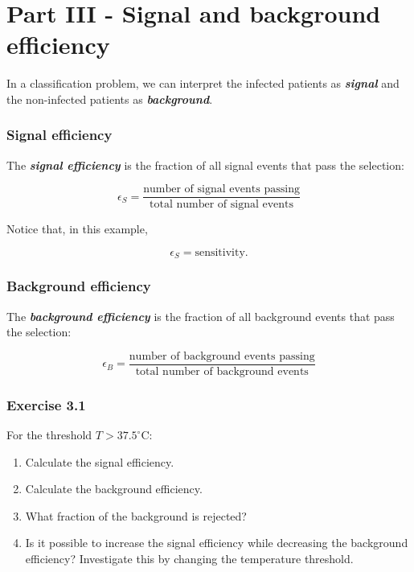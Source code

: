\documentclass[10pt]{article}
\begin{document}
\clearpage
\section*{Part III - Signal and background efficiency}
In a classification problem, we can interpret the infected patients as \textbf{\textit{signal}} and the non-infected patients as \textbf{\textit{background}}.

\subsubsection*{Signal efficiency}
The \textbf{\textit{signal efficiency}} is the fraction of all signal events that pass the selection:

\[
{
\epsilon_S =
\frac{\text{number of signal events passing}}
{\text{total number of signal events}}
}
\]

Notice that, in this example,

\[
\epsilon_S = \text{sensitivity}.
\]

\subsubsection*{Background efficiency}
The \textbf{\textit{background efficiency}} is the fraction of all background events that pass the selection:

\[
{
\epsilon_B =
\frac{\text{number of background events passing}}
{\text{total number of background events}}
}
\]

\subsubsection*{Exercise 3.1}
For the threshold $T>37.5^\circ\mathrm{C}$:

\begin{enumerate}
\item
Calculate the signal efficiency.

\item
Calculate the background efficiency.

\item
What fraction of the background is rejected?

\item
Is it possible to increase the signal efficiency while decreasing the background efficiency? Investigate this by changing the temperature threshold.

\end{enumerate}
\begingroup\color{red}
\end{document}
